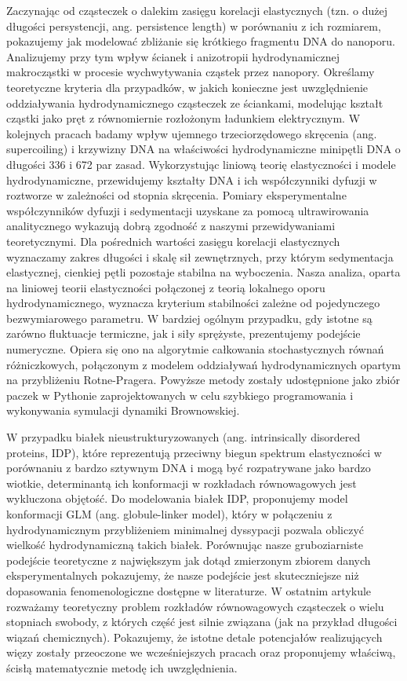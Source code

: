 Zaczynając od cząsteczek o dalekim zasięgu korelacji elastycznych (tzn. o dużej długości persystencji, ang. persistence length) w porównaniu z ich rozmiarem, pokazujemy jak modelować zbliżanie się krótkiego fragmentu DNA do nanoporu. Analizujemy przy tym wpływ ścianek i anizotropii hydrodynamicznej makrocząstki w procesie wychwytywania cząstek przez nanopory.
Określamy teoretyczne kryteria dla przypadków, w jakich konieczne jest uwzględnienie oddziaływania hydrodynamicznego cząsteczek ze ściankami, modelując kształt cząstki jako pręt z równomiernie rozłożonym ładunkiem elektrycznym.
W kolejnych pracach badamy wpływ ujemnego trzeciorzędowego skręcenia (ang. supercoiling) i krzywizny DNA na właściwości hydrodynamiczne minipętli DNA o długości 336 i 672 par zasad.
Wykorzystując liniową teorię elastyczności i modele hydrodynamiczne, przewidujemy kształty DNA i ich współczynniki dyfuzji w roztworze w zależności od stopnia skręcenia. 
Pomiary eksperymentalne współczynników dyfuzji i sedymentacji uzyskane za pomocą ultrawirowania analitycznego wykazują dobrą zgodność z naszymi przewidywaniami teoretycznymi. Dla pośrednich wartości zasięgu korelacji elastycznych wyznaczamy zakres długości i skalę sił zewnętrznych, przy którym sedymentacja elastycznej, cienkiej pętli pozostaje stabilna na wyboczenia.
Nasza analiza, oparta na liniowej teorii elastyczności połączonej z teorią lokalnego oporu hydrodynamicznego, wyznacza kryterium stabilności zależne od pojedynczego bezwymiarowego parametru. W bardziej ogólnym przypadku, gdy istotne są zarówno fluktuacje termiczne, jak i siły sprężyste, prezentujemy podejście numeryczne. Opiera się ono na algorytmie całkowania stochastycznych równań różniczkowych, połączonym z modelem oddziaływań hydrodynamicznych opartym na przybliżeniu Rotne-Pragera. Powyższe metody zostały udostępnione jako zbiór paczek w Pythonie zaprojektowanych w celu szybkiego programowania i wykonywania symulacji dynamiki Brownowskiej.

W przypadku białek nieustrukturyzowanych (ang. intrinsically disordered proteins, IDP), które reprezentują przeciwny biegun spektrum elastyczności w porównaniu z bardzo sztywnym DNA i mogą być rozpatrywane jako bardzo wiotkie, determinantą ich konformacji w rozkładach równowagowych jest wykluczona objętość. 
Do modelowania białek IDP, proponujemy model konformacji GLM (ang. globule-linker model), który w połączeniu z hydrodynamicznym przybliżeniem minimalnej dyssypacji pozwala obliczyć wielkość hydrodynamiczną takich białek.
Porównując nasze gruboziarniste podejście teoretyczne z największym jak dotąd zmierzonym zbiorem danych eksperymentalnych pokazujemy, że nasze podejście jest skuteczniejsze niż dopasowania fenomenologiczne dostępne w literaturze. W ostatnim artykule rozważamy teoretyczny problem rozkładów równowagowych cząsteczek o wielu stopniach swobody, z których część jest silnie związana (jak na przykład długości wiązań chemicznych).
Pokazujemy, że istotne detale potencjałów realizujących więzy zostały przeoczone we wcześniejszych pracach oraz proponujemy właściwą, ścisłą matematycznie metodę ich uwzględnienia.

